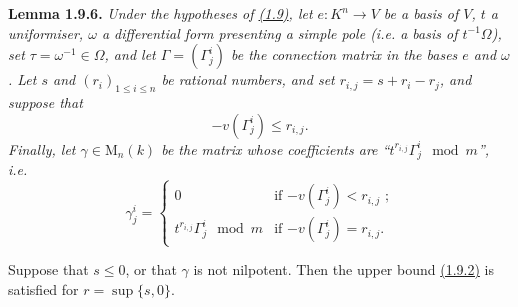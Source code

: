 \documentclass{report}
\newenvironment{itenv}[1]
  {\phantomsection\par\medskip\noindent\textbf{#1.}\itshape}
  {\medskip}
\newcommand{\MM}{\mathrm{M}}
\renewcommand{\leq}{\leqslant}
\begin{document}
\begin{itenv}{Lemma 1.9.6}
\label{II.1.9.6}
  Under the hypotheses of \hyperref[II.1.9]{(1.9)}, let $e\colon K^n\to V$ be a basis of $V$, $t$ a uniformiser, $\omega$ a differential form presenting a simple pole (i.e. a basis of $t^{-1}\Omega$), set $\tau=\omega^{-1}\in\Omega$, and let $\Gamma=(\Gamma_j^i)$ be the connection matrix in the bases $e$ and $\omega$.
  Let $s$ and $(r_i)_{1\leq i\leq n}$ be rational numbers, and set $r_{i,j}=s+r_i-r_j$, and suppose that
  \[
    -v(\Gamma_j^i) \leq r_{i,j}.
  \]
  Finally, let $\gamma\in \MM_n(k)$ be the matrix whose coefficients are ``$t^{r_{i,j}}\Gamma_j^i\mod m$'', i.e.
  \[
    \gamma_j^i =
    \begin{cases}
      0 & \mbox{if $-v(\Gamma_j^i)<r_{i,j}$ ;}
    \\t^{r_{i,j}}\Gamma_j^i\mod m & \mbox{if $-v(\Gamma_j^i)=r_{i,j}$.}
    \end{cases}
  \]

  Suppose that $s\leq0$, or that $\gamma$ is not nilpotent.
  Then the upper bound \hyperref[II.1.9.2]{(1.9.2)} is satisfied for $r=\sup\{s,0\}$.
\end{itenv}
\end{document}
